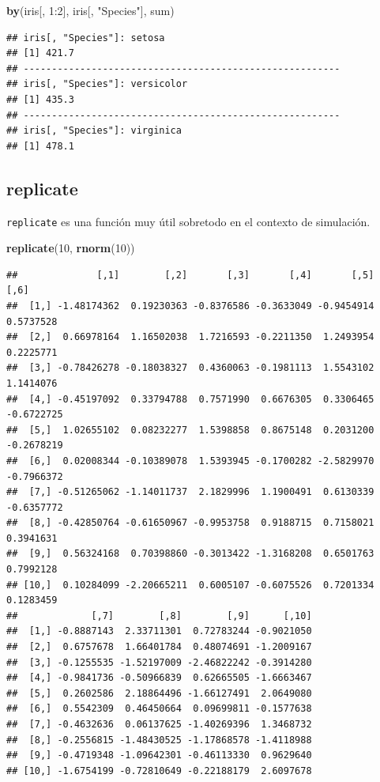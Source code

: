 \documentclass[]{article}
\newenvironment{Shaded}{\begin{snugshade}}{\end{snugshade}}
\newcommand{\KeywordTok}[1]{\textcolor[rgb]{0.13,0.29,0.53}{\textbf{{#1}}}}
\newcommand{\DecValTok}[1]{\textcolor[rgb]{0.00,0.00,0.81}{{#1}}}
\newcommand{\StringTok}[1]{\textcolor[rgb]{0.31,0.60,0.02}{{#1}}}
\newcommand{\NormalTok}[1]{{#1}}
\begin{document}
\begin{Shaded}
\begin{Highlighting}[]
\KeywordTok{by}\NormalTok{(iris[, }\DecValTok{1}\NormalTok{:}\DecValTok{2}\NormalTok{], iris[, }\StringTok{"Species"}\NormalTok{], sum)}
\end{Highlighting}
\end{Shaded}

\begin{verbatim}
## iris[, "Species"]: setosa
## [1] 421.7
## -------------------------------------------------------- 
## iris[, "Species"]: versicolor
## [1] 435.3
## -------------------------------------------------------- 
## iris[, "Species"]: virginica
## [1] 478.1
\end{verbatim}

\subsection{replicate}\label{replicate}

\texttt{replicate} es una función muy útil sobretodo en el contexto de
simulación.

\begin{Shaded}
\begin{Highlighting}[]
\KeywordTok{replicate}\NormalTok{(}\DecValTok{10}\NormalTok{, }\KeywordTok{rnorm}\NormalTok{(}\DecValTok{10}\NormalTok{))}
\end{Highlighting}
\end{Shaded}

\begin{verbatim}
##              [,1]        [,2]       [,3]       [,4]       [,5]       [,6]
##  [1,] -1.48174362  0.19230363 -0.8376586 -0.3633049 -0.9454914  0.5737528
##  [2,]  0.66978164  1.16502038  1.7216593 -0.2211350  1.2493954  0.2225771
##  [3,] -0.78426278 -0.18038327  0.4360063 -0.1981113  1.5543102  1.1414076
##  [4,] -0.45197092  0.33794788  0.7571990  0.6676305  0.3306465 -0.6722725
##  [5,]  1.02655102  0.08232277  1.5398858  0.8675148  0.2031200 -0.2678219
##  [6,]  0.02008344 -0.10389078  1.5393945 -0.1700282 -2.5829970 -0.7966372
##  [7,] -0.51265062 -1.14011737  2.1829996  1.1900491  0.6130339 -0.6357772
##  [8,] -0.42850764 -0.61650967 -0.9953758  0.9188715  0.7158021  0.3941631
##  [9,]  0.56324168  0.70398860 -0.3013422 -1.3168208  0.6501763  0.7992128
## [10,]  0.10284099 -2.20665211  0.6005107 -0.6075526  0.7201334  0.1283459
##             [,7]        [,8]        [,9]      [,10]
##  [1,] -0.8887143  2.33711301  0.72783244 -0.9021050
##  [2,]  0.6757678  1.66401784  0.48074691 -1.2009167
##  [3,] -0.1255535 -1.52197009 -2.46822242 -0.3914280
##  [4,] -0.9841736 -0.50966839  0.62665505 -1.6663467
##  [5,]  0.2602586  2.18864496 -1.66127491  2.0649080
##  [6,]  0.5542309  0.46450664  0.09699811 -0.1577638
##  [7,] -0.4632636  0.06137625 -1.40269396  1.3468732
##  [8,] -0.2556815 -1.48430525 -1.17868578 -1.4118988
##  [9,] -0.4719348 -1.09642301 -0.46113330  0.9629640
## [10,] -1.6754199 -0.72810649 -0.22188179  2.6097678
\end{verbatim}
\end{document}
